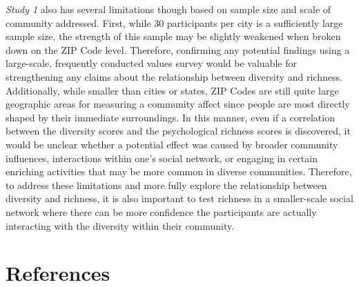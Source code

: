 \documentclass[
  man,floatsintext]{apa7}
\begin{document}
\emph{Study 1} also has several limitations though based on sample size and scale of community addressed. First, while 30 participants per city is a sufficiently large sample size, the strength of this sample may be slightly weakened when broken down on the ZIP Code level. Therefore, confirming any potential findings using a large-scale, frequently conducted values survey would be valuable for strengthening any claims about the relationship between diversity and richness. Additionally, while smaller than cities or states, ZIP Codes are still quite large geographic areas for measuring a community affect since people are most directly shaped by their immediate surroundings. In this manner, even if a correlation between the diversity scores and the psychological richness scores is discovered, it would be unclear whether a potential effect was caused by broader community influences, interactions within one's social network, or engaging in certain enriching activities that may be more common in diverse communities. Therefore, to address these limitations and more fully explore the relationship between diversity and richness, it is also important to test richness in a smaller-scale social network where there can be more confidence the participants are actually interacting with the diversity within their community.

\newpage

\hypertarget{references}{%
\section{References}\label{references}}
\end{document}
